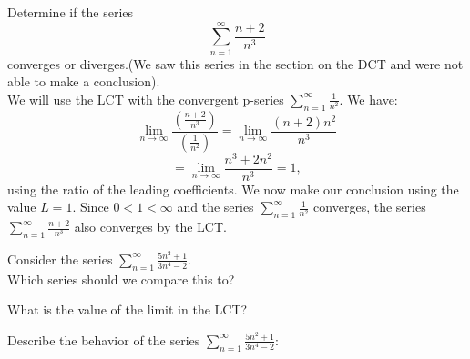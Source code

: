 \documentclass{ximera}
\begin{document}
\begin{example}
Determine if the series 
\[
\sum_{n=1}^\infty \frac{n+2}{n^3}
\]
converges or diverges.(We saw this series in the section on the DCT and were not able to make a conclusion).\\
We will use the LCT with the convergent p-series $\displaystyle{\sum_{n=1}^\infty \frac{1}{n^2}}$. We have:
\[
\lim_{n \to \infty} \frac{\left(\frac{n+2}{n^3}\right)}{\left(\frac{1}{n^2}\right)} = \lim_{n \to \infty} \frac{(n+2)n^2}{n^3}
\]
\[
= \lim_{n \to \infty} \frac{n^3 +2n^2}{n^3} = 1,
\]
using the ratio of the leading coefficients. We now make our conclusion using the value $L = 1$. Since $0 < 1 < \infty$ and the series $\displaystyle{\sum_{n=1}^\infty \frac{1}{n^2}}$
converges, the series $\displaystyle{\sum_{n=1}^\infty \frac{n+2}{n^3}}$ also converges by the LCT.
\end{example}




\begin{problem}
Consider the series $\displaystyle{\sum_{n=1}^\infty \frac{5n^2 + 1}{3n^4 - 2}}$.\\
Which series should we compare this to?

\begin{multipleChoice}
\end{multipleChoice}

What is the value of the limit in the LCT?
\begin{multipleChoice}
\end{multipleChoice}

Describe the behavior of the series $\displaystyle{\sum_{n=1}^\infty \frac{5n^2 + 1}{3n^4 - 2}:}$
\begin{multipleChoice}
\end{multipleChoice}

\end{problem}
\end{document}
